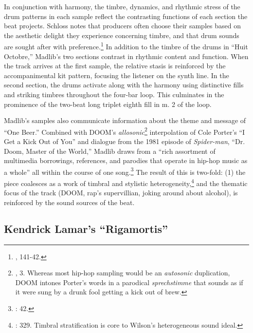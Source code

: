 In conjunction with harmony, the timbre, dynamics, and rhythmic stress of the drum patterns in each sample reflect the contrasting functions of each section the beat projects. Schloss notes that producers often choose their samples based on the aesthetic delight they experience concerning timbre, and that drum sounds are sought after with preference.\footnote{\cite{josephgschlossMakingBeatsArt2004}, 141-42.} In addition to the timbre of the drums in ``Huit Octobre,'' Madlib's two sections contrast in rhythmic content and function. When the track arrives at the first sample, the relative stasis is reinforced by the accompanimental kit pattern, focusing the listener on the synth line. In the second section, the drums activate along with the harmony using distinctive fills and striking timbres throughout the four-bar loop. This culminates in the prominence of the two-beat long triplet eighth fill in m. 2 of the loop.

Madlib's samples also communicate information about the theme and message of ``One Beer.'' Combined with DOOM's \emph{allosonic}\footnote{\cite{justinawilliamsRhyminStealinMusical2013}, 3. Whereas most hip-hop sampling would be an \emph{autosonic} duplication, DOOM intones Porter's words in a parodical \textit{sprechstimme} that sounds as if it were sung by a drunk fool getting a kick out of brew.} interpolation of Cole Porter's ``I Get a Kick Out of You'' and dialogue from the 1981 episode of \textit{Spider-man}, ``Dr. Doom, Master of the World,'' Madlib draws from a ``rich assortment of multimedia borrowings, references, and parodies that operate in hip-hop music as a whole'' all within the course of one song.\footnote{\cite{joannademersSampling1970sHipHop2003}: 42.} The result of this is two-fold: (1) the piece coalesces as a work of timbral and stylistic heterogeneity,\footnote{\cite{ollywilsonHeterogeneousSoundIdeal1992}: 329. Timbral stratification is core to Wilson's heterogeneous sound ideal.} and the thematic focus of the track (DOOM, rap's supervillian, joking around about alcohol), is reinforced by the sound sources of the beat.

\subsection*{\centering Kendrick Lamar's ``Rigamortis''}

